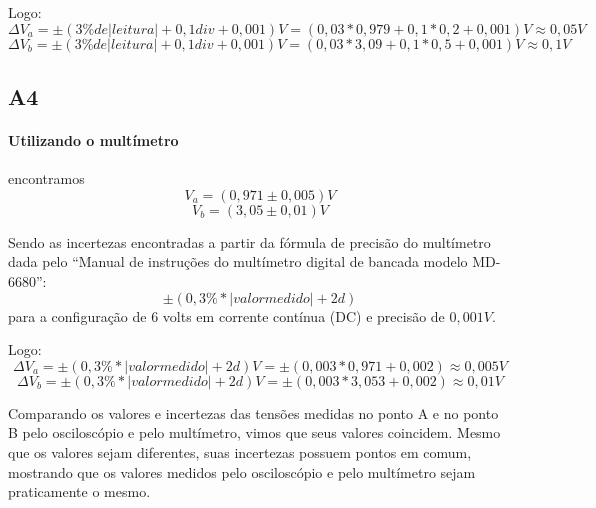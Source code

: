         Logo:
        $$\Delta V_a = \pm(3\% de |leitura| + 0,1 div + 0,001) V = (0,03*0,979 + 0,1*0,2 + 0,001) V \approx 0,05 V$$
        $$\Delta V_b = \pm(3\% de |leitura| + 0,1 div + 0,001) V = (0,03*3,09 + 0,1*0,5 + 0,001) V \approx 0,1 V$$
    \subsection{A4}
        \paragraph{Utilizando o multímetro} encontramos 
        $$V_a = (0,971 \pm 0,005) V$$
        $$V_b = (3,05 \pm  0,01) V$$
        
        Sendo as incertezas encontradas a partir 
        da fórmula de precisão do multímetro dada 
        pelo “Manual de instruções do multímetro 
        digital de bancada modelo MD-6680”: 
        $$\pm(0,3\% * |valor medido| + 2d)$$
        para a configuração de 6 volts em 
        corrente contínua (DC) e precisão de 
        $0,001 V$.
        \newline
        
        Logo: 
        $$\Delta V_a = \pm(0,3\% * |valor medido| + 2d) V = \pm(0,003*0,971 + 0,002) \approx 0,005 V$$
        $$\Delta V_b = \pm(0,3\% * |valor medido| + 2d) V = \pm(0,003*3,053 + 0,002) \approx 0,01 V$$

        Comparando os valores e incertezas das 
        tensões medidas no ponto A e no ponto B 
        pelo osciloscópio e pelo multímetro, 
        vimos que seus valores coincidem. 
        Mesmo que os valores sejam diferentes, 
        suas incertezas possuem pontos em comum, 
        mostrando que os valores medidos pelo 
        osciloscópio e pelo multímetro sejam 
        praticamente o mesmo.